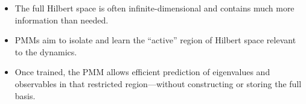 \begin{itemize}
	\item The full Hilbert space is often infinite-dimensional and contains much more information than needed.
	\item PMMs aim to isolate and learn the “active” region of Hilbert space relevant to the dynamics.
	\item Once trained, the PMM allows efficient prediction of eigenvalues and observables in that restricted region—without constructing or storing the full basis.
\end{itemize}